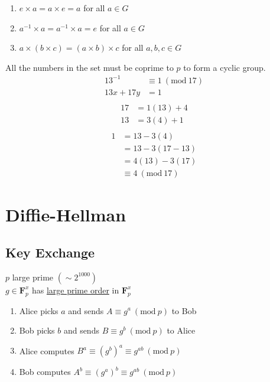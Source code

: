 \documentclass{article}
\newcommand{\Mod}[1]{\ (\mathrm{mod}\ #1)}
\begin{document}
\begin{multicols}{2}
    \begin{enumerate}[label=(\Roman*)]
        \item \(e \times a = a \times e = a\) for all \(a \in G\) %
        \item \(a^{-1} \times a = a^{-1} \times a = e\) for all \(a \in G\) %
        \item \(a \times (b \times c) = (a \times b) \times c\) for all \(a, b, c \in G\) %
    \end{enumerate}
    All the numbers in the set must be coprime to \(p\) to form a cyclic group.
    \begin{align*}
        13^{-1}   & \equiv 1 \Mod{17} \\
        13x + 17y & = 1               \\
    \end{align*}
    \begin{align*}
        17 & = 1(13) + 4 \\
        13 & = 3(4) + 1  \\
    \end{align*}
    \begin{align*}
        1 & = 13 - 3(4)       \\
          & = 13 - 3(17 - 13) \\
          & = 4(13) - 3(17)   \\
          & \equiv 4 \Mod{17}
    \end{align*}

    \columnbreak

    \section*{Diffie-Hellman}
    \subsection*{Key Exchange}
    \(p\) large prime \((\sim 2^{1000})\) \\
    \(g \in \mathbf{F}_p^x\) has \underline{large prime order} in \(\mathbf{F}_p^x\)
    \begin{enumerate}
        \item Alice picks \(a\) and sends \(A \equiv g^a \Mod{p}\) to Bob
        \item Bob picks \(b\) and sends \(B \equiv g^b \Mod{p}\) to Alice
        \item Alice computes \(B^a \equiv (g^b)^a \equiv g^{ab} \Mod{p}\)
        \item Bob computes \(A^b \equiv (g^a)^b \equiv g^{ab} \Mod{p}\)
    \end{enumerate}


\end{multicols}
\end{document}
